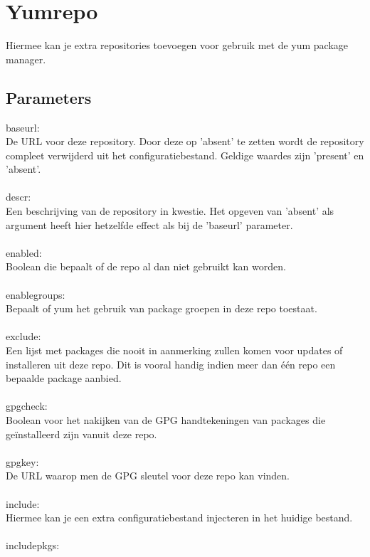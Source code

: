 \section{Yumrepo}

Hiermee kan je extra repositories toevoegen voor gebruik met de yum package manager.

\subsection{Parameters}

baseurl:\\
De URL voor deze repository. Door deze op 'absent' te zetten wordt de repository compleet verwijderd uit het configuratiebestand. Geldige waardes zijn 'present' en 'absent'.\\\\
%
descr:\\
Een beschrijving van de repository in kwestie. Het opgeven van 'absent' als argument heeft hier hetzelfde effect als bij de 'baseurl' parameter.\\\\
%
enabled:\\
Boolean die bepaalt of de repo al dan niet gebruikt kan worden.\\\\
%
enablegroups:\\
Bepaalt of yum het gebruik van package groepen in deze repo toestaat.\\\\
%
exclude:\\
Een lijst met packages die nooit in aanmerking zullen komen voor updates of installeren uit deze repo. Dit is vooral handig indien meer dan \'e\'en repo een bepaalde package aanbied.\\\\
%
gpgcheck:\\
Boolean voor het nakijken van de GPG handtekeningen van packages die ge\"installeerd zijn vanuit deze repo.\\\\
%
gpgkey:\\
De URL waarop men de GPG sleutel voor deze repo kan vinden.\\\\
%
include:\\
Hiermee kan je een extra configuratiebestand injecteren in het huidige bestand.\\\\
%
includepkgs:\\
